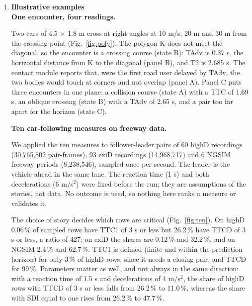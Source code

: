 \documentclass[preprint,12pt, a4paper]{elsarticle}
\begin{document}
\begin{enumerate}
\begin{enumerate}
\begin{footnotesize}
\begin{verbatim}
bank = datasets.load_conflict_bank("ngsim")
w = bank.window(bank.select("B")[0])
e = process.pair_series(w, 0, 1)   # TTC, TAdv, T2, TG
viz.plot_indicator_profile(e)

m = scenario.following_measures(   # ten measures, 1-D
    datasets.make("following"), leader=0, follower=1)
\end{verbatim}\end{footnotesize}
\end{enumerate}

\item \textbf{Illustrative examples}\label{sec:examples}\\

\textbf{One encounter, four readings.}

Two cars of 4.5 $\times$ 1.8 m cross at right angles at 10 m/s, 20 m and 30 m from the crossing point (Fig.~\ref{fig:poly}). The polygon K does not meet the diagonal, so the encounter is a crossing course (state B): TAdv is 0.37 s, the horizontal distance from K to the diagonal (panel B), and T2 is 2.685 s. The contact module reports that, were the first road user delayed by TAdv, the two bodies would touch at corners and not overlap (panel A). Panel C puts three encounters in one plane: a collision course (state A) with a TTC of 1.69 s, an oblique crossing (state B) with a TAdv of 2.65 s, and a pair too far apart for the horizon (state C).

\textbf{Ten car-following measures on freeway data.}

We applied the ten measures to follower-leader pairs of 60 highD recordings (30,765,802 pair-frames), 93 exiD recordings (14,968,717) and 6 NGSIM freeway periods (8,238,546), sampled once per second. The leader is the vehicle ahead in the same lane. The reaction time (1 s) and both decelerations (6 m/s$^2$) were fixed before the run; they are assumptions of the stories, not data. No outcome is used, so nothing here ranks a measure or validates it.

The choice of story decides which rows are critical (Fig.~\ref{fig:ten}). On highD 0.06\,\% of sampled rows have TTC1 of 3 s or less but 26.2\,\% have TTCD of 3 s or less, a ratio of 427; on exiD the shares are 0.12\,\% and 32.2\,\%, and on NGSIM 2.4\,\% and 62.7\,\%. TTC1 is defined (finite and within the prediction horizon) for only 3\,\% of highD rows, since it needs a closing pair, and TTCD for 99\,\%. Parameters matter as well, and not always in the same direction: with a reaction time of 1.5 s and decelerations of 4 m/s$^2$, the share of highD rows with TTCD of 3 s or less falls from 26.2\,\% to 11.0\,\%, whereas the share with SDI equal to one rises from 26.2\,\% to 47.7\,\%.


\end{enumerate}
\end{document}
